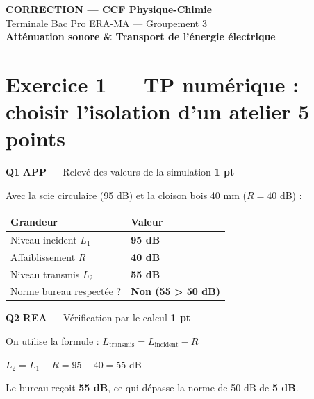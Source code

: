 \documentclass[a4paper,11pt]{article}
\newcommand{\pts}[1]{\hfill\textcolor{gris}{\small\textbf{#1}}}
\newcommand{\comp}[1]{\colorbox{blue!10}{\scriptsize\textbf{#1}}}
\begin{document}
\begin{center}
{\LARGE\bfseries\color{rouge} CORRECTION — CCF Physique-Chimie}\\[8pt]
{\large Terminale Bac Pro ERA-MA — Groupement 3}\\[8pt]
{\Large\bfseries Atténuation sonore \& Transport de l'énergie électrique}
\end{center}

\vspace{10pt}

\section*{Exercice 1 — TP numérique : choisir l'isolation d'un atelier \pts{5 points}}

\textbf{Q1} \comp{APP} — Relevé des valeurs de la simulation \pts{1 pt}

\begin{reponsecorr}
Avec la scie circulaire (95 dB) et la cloison bois 40 mm ($R = 40$ dB) :

\begin{center}
\renewcommand{\arraystretch}{1.5}
\begin{tabular}{|>{\centering\arraybackslash}m{5cm}|>{\centering\arraybackslash}m{4cm}|}
\hline
\textbf{Grandeur} & \textbf{Valeur} \\
\hline
Niveau incident $L_1$ & \textcolor{rouge}{\textbf{95 dB}} \\
\hline
Affaiblissement $R$ & \textcolor{rouge}{\textbf{40 dB}} \\
\hline
Niveau transmis $L_2$ & \textcolor{rouge}{\textbf{55 dB}} \\
\hline
Norme bureau respectée ? & \textcolor{rouge}{\textbf{Non (55 > 50 dB)}} \\
\hline
\end{tabular}
\renewcommand{\arraystretch}{1}
\end{center}
\end{reponsecorr}

\textbf{Q2} \comp{REA} — Vérification par le calcul \pts{1 pt}

\begin{reponsecorr}
On utilise la formule : $L_{\text{transmis}} = L_{\text{incident}} - R$

\medskip
$L_2 = L_1 - R = 95 - 40 = \boxed{55 \text{ dB}}$

\medskip
Le bureau reçoit \textbf{55 dB}, ce qui dépasse la norme de 50 dB de \textbf{5 dB}.
\end{reponsecorr}
\end{document}
